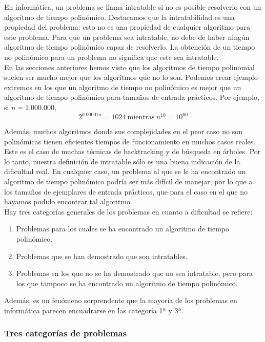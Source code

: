 En informática, un problema se llama intratable si no es posible resolverlo con un algoritmo de tiempo polinómico. Destacamos que la intratabilidad es una propiedad del problema: esto no es una propiedad de cualquier algoritmo para este problema. Para que un problema sea intratable, no debe de haber ningún algoritmo de tiempo polinómico capaz de resolverlo. La obtención de un tiempo no polinómico para un problema no significa que este sea intratable.\\

En las secciones anteriores hemos visto que los algoritmos de tiempo polinomial suelen ser mucho mejor que los algoritmos que no lo son. Podemos crear ejemplo extremos en los que un algoritmo de tiempo no polinómico es mejor que un algoritmo de tiempo polinómico para tamaños de entrada prácticos. Por ejemplo, si $n = 1.000.000$,\\
\[ 2^{0.00001n} = 1024\ \mbox{mientras}\ n^{10} = 10^{60} \]

Además, muchos algoritmos donde sus complejidades en el peor caso no son polinómicas tienen eficientes tiempos de funcionamiento en muchos casos reales. Este es el caso de muchas técnicas de backtracking y de búsqueda en árboles. Por lo tanto, nuestra definición de intratable sólo es una buena indicación de la dificultad real. En cualquier caso, un problema al que se le ha encontrado un algoritmo de tiempo polinómico podría ser más difícil de manejar, por lo que a los tamaños de ejemplares de entrada prácticos, que para el caso en el que no hayamos podido encontrar tal algoritmo. \\

Hay tres categorías generales de los problemas en cuanto a dificultad se refiere:
\begin{enumerate}
\item Problemas para los cuales se ha encontrado un algoritmo de tiempo polinómico.
\item Problemas que se han demostrado que son intratables.
\item Problemas en los que no se ha demostrado que no sea intratable, pero para los que tampoco se ha encontrado un algoritmo de tiempo polinómico.
\end{enumerate}

Además, es un fenómeno sorprendente que la mayoría de los problemas en informática parecen encuadrarse en las categoría 1ª y 3ª.\\

\subsubsection{Tres categorías de problemas}

